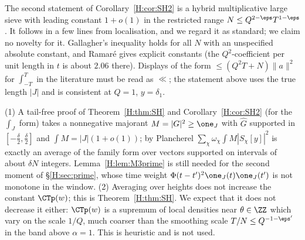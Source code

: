 The second statement of Corollary~\ref{H:cor:SH2} is a hybrid multiplicative large sieve with leading constant $1+o(1)$ in the restricted range $N\le Q^{2-\eps}T^{1-\eps}$. It follows in a few lines from localisation, and we regard it as standard; we claim no novelty for it. Gallagher's inequality \cite[Theorem~3]{Gal70} holds for all $N$ with an unspecified absolute constant, and Ramar\'e \cite[\S6]{Ram16} gives explicit constants (the $Q^2$-coefficient per unit length in $t$ is about $2.06$ there). Displays of the form $\le(Q^2T+N)\|a\|^2$ for $\int_{-T}^T$ in the literature must be read as $\ll$; the statement above uses the true length $|J|$ and is consistent at $Q=1$, $y=\delta_1$.

\begin{remark}\label{H:rem:SH}
(1) A tail-free proof of Theorem~\ref{H:thm:SH} and Corollary~\ref{H:cor:SH2} (for the $\int_J$ form) takes a nonnegative majorant $M=|G|^2\ge\one_J$ with $\widehat G$ supported in $[-\frac\delta2,\frac\delta2]$ and $\int M=|J|(1+o(1))$; by Plancherel $\sum_\chi\omega_\chi\int M|S_\chi[y]|^2$ is exactly an average of the family form over vectors supported on intervals of about $\delta N$ integers. Lemma~\ref{H:lem:M3prime} is still needed for the second moment of \S\ref{H:sec:prime}, whose time weight $\Phi(t-t')^2\one_J(t)\one_J(t')$ is not monotone in the window.
(2) Averaging over heights does not increase the constant $\CTp(w)$; this is Theorem~\ref{H:thm:SH}. We expect that it does not decrease it either: $\CTp(w)$ is a supremum of local densities near $\theta\in\ZZ$ which vary on the scale $1/Q$, much coarser than the smoothing scale $T/N\le Q^{-1-\eps'}$ in the band above $\alpha=1$. This is heuristic and is not used.
\end{remark}

